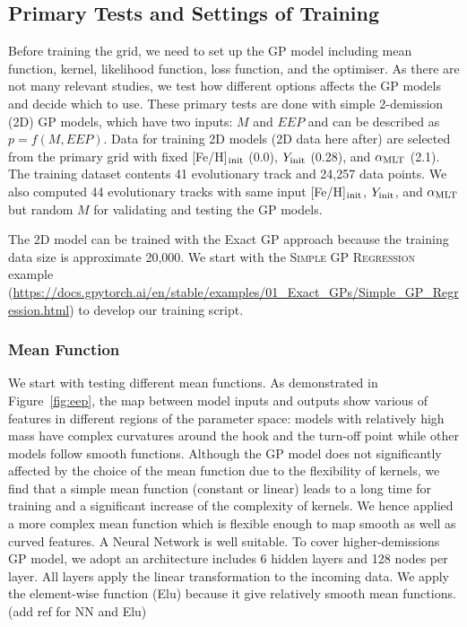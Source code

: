 \subsection{Primary Tests and Settings of Training}

Before training the grid, we need to set up the GP model including mean function, kernel, likelihood function, loss function, and the optimiser. As there are not many relevant studies, we test how different options affects the GP models and decide which to use. These primary tests are done with simple 2-demission (2D) GP models, which have two inputs: $M$ and $EEP$ and can be described as $p = f(M, EEP)$. 
%
Data for training 2D models (2D data here after) are selected  from the primary grid with fixed [Fe/H]$_{\rm init}$ (0.0), $Y_{\rm init}$ (0.28), and $\alpha_{\rm MLT}$ (2.1). The training dataset contents 41 evolutionary track and 24,257 data points.
%
We also computed 44 evolutionary tracks with same input [Fe/H]$_{\rm init}$, $Y_{\rm init}$, and $\alpha_{\rm MLT}$ but random $M$ for validating and testing the GP models. 

The 2D model can be trained with the Exact GP approach because the training data size is approximate 20,000. We start with the \textsc{Simple GP Regression} example (\url{https://docs.gpytorch.ai/en/stable/examples/01_Exact_GPs/Simple_GP_Regression.html})  to develop our training script.

\subsubsection{Mean Function}

We start with testing different mean functions. As demonstrated in Figure~\ref{fig:eep}, the map between model inputs and outputs show various of features in different regions of the parameter space: models with relatively high mass have complex curvatures around the hook and the turn-off point while other models follow smooth functions. Although the GP model does not significantly affected by the choice of the mean function due to the flexibility of kernels, we find that a simple mean function (constant or linear) leads to a long time for training and a significant increase of the complexity of kernels. We hence applied a more complex mean function which is flexible enough to map smooth as well as curved features. A Neural Network is well suitable. To cover higher-demissions GP model, we adopt an architecture includes 6 hidden layers and 128 nodes per layer. All layers apply the linear transformation to the incoming data. We apply the element-wise function (Elu) because it give relatively smooth mean functions. (add ref for NN and Elu)

